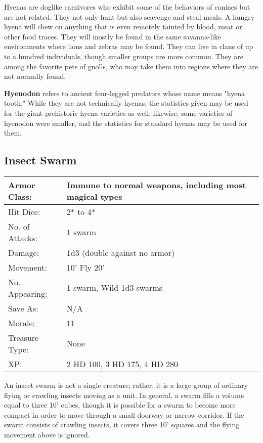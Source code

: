 \documentclass[a4paper,twoside,openany,10pt]{book}
\begin{document}
\begin{multicols}{2}
Hyenas are doglike carnivores who exhibit some of the behaviors of canines but are not related. They not only hunt but also scavenge and steal meals. A hungry hyena will chew on anything that is even remotely tainted by blood, meat or other food traces. They will mostly be found in the same savanna-like environments where lions and zebras may be found. They can live in clans of up to a hundred individuals, though smaller groups are more common. They are among the favorite pets of gnolls, who may take them into regions where they are not normally found.

\textbf{Hyenodon }refers to ancient four-legged predators whose name means "hyena tooth." While they are not technically hyenas, the statistics given may be used for the giant prehistoric hyena varieties as well; likewise, some varieties of hyenodon were smaller, and the statistics for standard hyenas may be used for them.

\subsection*{Insect Swarm}\label{insect-swarm}

\begin{tabularx}{0.50\textwidth}{@{}lX@{}}
Armor Class: & Immune to normal weapons, including most magical types \\\hline
Hit Dice: & 2* to 4* \\\hline
No. of Attacks: & 1 swarm \\\hline
Damage: & 1d3 (double against no armor) \\\hline
Movement: & 10' Fly 20' \\\hline
No. Appearing: & 1 swarm, Wild 1d3 swarms \\\hline
Save As: & N/A \\\hline
Morale: & 11 \\\hline
Treasure Type: & None \\\hline
XP: & 2 HD 100, 3 HD 175, 4 HD 280 \\\hline
\end{tabularx}\medskip

An insect swarm is not a single creature; rather, it is a large group of ordinary flying or crawling insects moving as a unit. In general, a swarm fills a volume equal to three 10' cubes, though it is possible for a swarm to become more compact in order to move through a small doorway or narrow corridor. If the swarm consists of crawling insects, it covers three 10' squares and the flying movement above is ignored.


\end{multicols}
\end{document}
